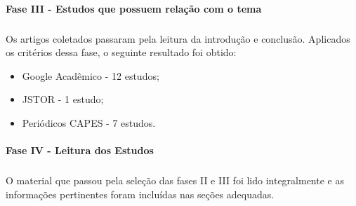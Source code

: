 \paragraph{Fase III - Estudos que possuem relação com o tema}
\subparagraph{}
\quad Os artigos coletados passaram pela leitura da introdução e conclusão.
Aplicados os critérios dessa fase, o seguinte resultado foi obtido:
\begin{itemize}
  \item Google Acadêmico - 12 estudos;
  \item JSTOR - 1 estudo;
  \item Periódicos CAPES - 7 estudos.
\end{itemize}
\paragraph{Fase IV - Leitura dos Estudos}
\subparagraph{}
\quad O material que passou pela seleção das fases II e III foi lido integralmente e as
informações pertinentes foram incluídas nas seções adequadas.
